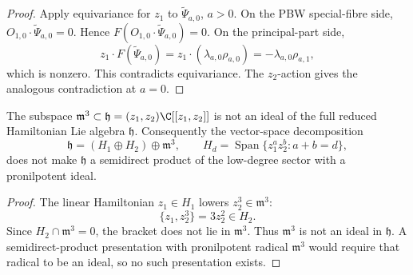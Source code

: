 \begin{proof}
  Apply equivariance for \(z_1\) to \(\widetilde\Psi_{a,0}\), \(a>0\).  On the
  PBW special-fibre side,
  \(O_{1,0}\cdot\widetilde\Psi_{a,0}=0\).  Hence
  \(F(O_{1,0}\cdot\widetilde\Psi_{a,0})=0\).  On the principal-part side,
  \[
    z_1\cdot F(\widetilde\Psi_{a,0})
    =
    z_1\cdot(\lambda_{a,0}\rho_{a,0})
    =
    -\lambda_{a,0}\rho_{a,1},
  \]
  which is nonzero.  This contradicts equivariance.  The \(z_2\)-action
  gives the analogous contradiction at \(a=0\).
\end{proof}

\begin{prop}\label{prop:lane-low-degree-pronilpotent-obstruction}
  The subspace \(\mathfrak m^3\subset\mathfrak h=(z_1,z_2)\C[[z_1,z_2]]\)
  is not an ideal of the full reduced Hamiltonian Lie algebra
  \(\mathfrak h\).  Consequently the vector-space decomposition
  \[
    \mathfrak h=(H_1\oplus H_2)\oplus\mathfrak m^3,
    \qquad
    H_d=\operatorname{Span}\{z_1^az_2^b:a+b=d\},
  \]
  does not make \(\mathfrak h\) a semidirect product of the low-degree
  sector with a pronilpotent ideal.
\end{prop}

\begin{proof}
  The linear Hamiltonian \(z_1\in H_1\) lowers \(z_2^3\in\mathfrak m^3\):
  \[
    \{z_1,z_2^3\}=3z_2^2\in H_2.
  \]
  Since \(H_2\cap\mathfrak m^3=0\), the bracket does not lie in
  \(\mathfrak m^3\).  Thus \(\mathfrak m^3\) is not an ideal in
  \(\mathfrak h\).  A semidirect-product presentation with
  pronilpotent radical \(\mathfrak m^3\) would require that radical to
  be an ideal, so no such presentation exists.
\end{proof}


